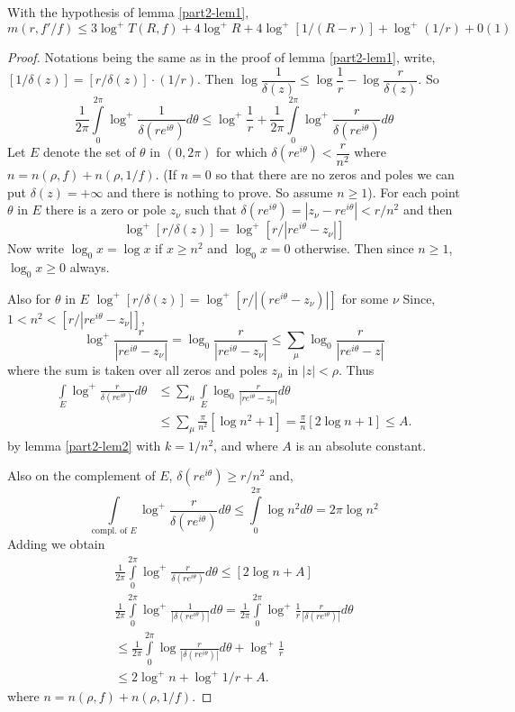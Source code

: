 \begin{lem}\label{part2-lem3}
With the hypothesis of lemma \ref{part2-lem1},
$$
m(r,f'/f)\leq
3\log^{+}T(R,f)+4\log^{+}R+4\log^{+}[1/(R-r)]+\log^{+}(1/r)+0(1)
$$
\end{lem}

\begin{proof}
Notations being the same as in the proof of lemma \ref{part2-lem1},
write, $[1/\delta(z)]=[r/\delta(z)]\cdot (1/r)$. Then
$\log\dfrac{1}{\delta(z)}\leq
\log\dfrac{1}{r}-\log\dfrac{r}{\delta(z)}$. So
$$
\frac{1}{2\pi}\int\limits^{2\pi}_{0}\log^{+}\frac{1}{\delta(re^{i\theta})}d\theta\leq
\log^{+}\frac{1}{r}+\frac{1}{2\pi}\int\limits^{2\pi}_{0}\log^{+}\frac{r}{\delta(re^{i\theta})}d\theta 
$$
Let $E$ denote the set of $\theta$ in $(0,2\pi)$ for which
$\delta(re^{i\theta})<\dfrac{r}{n^{2}}$ where
$n=n(\rho,f)+n(\rho,1/f)$. (If $n=0$ so that there are no zeros and
poles we can put $\delta(z)=+\infty$ and there is nothing to prove. So
assume $n\geq 1$). For each point $\theta$ in $E$ there is a zero or
pole $z_{\nu}$ such that
$\delta(re^{i\theta})=|z_{\nu}-re^{i\theta}|<r/n^{2}$\pageoriginale
and then
$$
\log^{+}[r/\delta(z)]=\log^{+}[r/|re^{i\theta}-z_{\nu}|]
$$
Now write $\log_{0}x=\log x$ if $x\geq n^{2}$ and $\log_{0}x=0$
otherwise. Then since $n\geq 1$, $\log_{0}x\geq 0$ always.

Also for $\theta$ in $E$
$\log^{+}[r/\delta(z)]=\log^{+}[r/|(re^{i\theta}-z_{\nu})|]$ for some
$\nu$ Since, $1<n^{2}<[r/|re^{i\theta}-z_{\nu}|]$,
$$
\log^+\frac{r}{|re^{i\theta}-z_{\nu}|}=\log_{0}\frac{r}{|re^{i\theta}-z_{\nu}|}\leq
\sum_{\mu}\log_{0}\frac{r}{|re^{i\theta}-z|} 
$$
where the sum is taken over all zeros and poles $z_{\mu}$ in
$|z|<\rho$. Thus 
\begin{align*}
\int\limits_{E}\log^{+}\frac{r}{\delta(re^{i\theta})}d\theta &\leq
\sum_{\mu}\int\limits_{E}\log_{0}\frac{r}{|re^{i\theta}-z_{\mu}|}d\theta\\
&\leq \sum_{\mu}\frac{\pi}{n^{2}}[\log n^{2}+1]=\frac{\pi}{n}[2\log
  n+1]\leq A.
\end{align*}
by lemma \ref{part2-lem2} with $k=1/n^{2}$, and where $A$ is an
absolute constant.

Also on the complement of $E$, $\delta(re^{i\theta})\geq r/n^{2}$ and, 
$$
\int\limits_{\text{compl. of }
  E}\log^{+}\frac{r}{\delta(re^{i\theta})}d\theta\leq
  \int\limits^{2\pi}_{0}\log n^{2}d\theta=2\pi\log n^{2}
$$
Adding we obtain
\begin{gather*}
\frac{1}{2\pi}\int\limits^{2\pi}_{0}\log^{+}\frac{r}{\delta(re^{i\theta})}d\theta\leq
     [2\log n+A]\\
\frac{1}{2\pi}\int\limits^{2\pi}_{0}\log^{+}\frac{1}{|\delta(re^{i\theta})|}d\theta=\frac{1}{2\pi}\int\limits^{2\pi}_{0}\log^{+}\frac{1}{r}\frac{r}{|\delta(re^{i\theta})|}d\theta\\
\leq
\frac{1}{2\pi}\int\limits^{2\pi}_{0}\log\frac{r}{|\delta(re^{i\theta})|}d\theta+\log^{+}\frac{1}{r}\\
\leq 2\log^{+}n+\log^{+}1/r+A.
\end{gather*}\pageoriginale
where $n=n(\rho,f)+n(\rho,1/f)$.


\end{proof}

